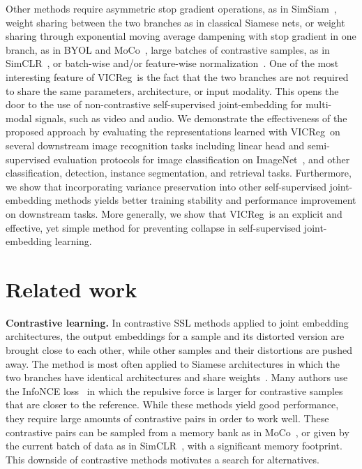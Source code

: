 \documentclass{article} %
\newcommand{\algo}{VICReg}
\begin{document}
Other methods require asymmetric stop gradient operations, as in SimSiam~\cite{chen2020simsiam}, weight sharing between the two branches as in classical Siamese nets, or weight sharing through exponential moving average dampening with stop gradient in one branch, as in BYOL and MoCo~\cite{he2020moco, grill2020byol,chen2020mocov2}, large batches of contrastive samples, as in SimCLR~\cite{chen2020simclr}, or batch-wise and/or feature-wise normalization~\cite{caron2020swav, grill2020byol, chen2020simsiam, zbontar2021barlow, ermolov2021whitening}. One of the most interesting feature of \algo \ is the fact that the two branches are not required to share the same parameters, architecture, or input modality. This opens the door to the use of non-contrastive self-supervised joint-embedding for multi-modal signals, such as video and audio. We demonstrate the effectiveness of the proposed approach by evaluating the representations learned with \algo \ on several downstream image recognition tasks including linear head and semi-supervised evaluation protocols for image classification on ImageNet~\cite{deng2009imagenet}, and other classification, detection, instance segmentation, and retrieval tasks. Furthermore, we show that incorporating variance preservation into other self-supervised joint-embedding methods yields better training stability and performance improvement on downstream tasks. More generally, we show that \algo \ is an explicit and effective, yet simple method for preventing collapse in self-supervised joint-embedding learning.

  
\section{Related work}

\noindent \textbf{Contrastive learning.} In contrastive SSL methods applied to joint embedding architectures, the output embeddings for a sample and its distorted version are brought close to each other, while other samples and their distortions are pushed away. The method is most often applied to Siamese architectures in which the two branches have identical architectures and share weights~\cite{misra2020pirl, he2020moco, bromley1994siamese, hjelm2019mutual, chen2020simclr, chen2020mocov2, hadsell2006contrastive, ye2019spreading, wu2018discrimination, oord2018coding, chen2020simclrv2}. Many authors use the InfoNCE loss~\cite{oord2018coding} in which the repulsive force is larger for contrastive samples that are closer to the reference. While these methods yield good performance, they require large amounts of contrastive pairs in order to work well. These contrastive pairs can be sampled from a memory bank as in MoCo~\cite{he2020moco}, or given by the current batch of data as in SimCLR~\cite{chen2020simclr}, with a significant memory footprint. This downside of contrastive methods motivates a search for alternatives.
\end{document}

